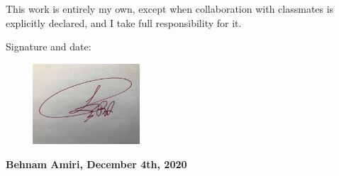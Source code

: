 \documentclass[fleqn]{article}
\begin{document}
\bigbreak

\Large This work is entirely my own, except when collaboration with classmates is explicitly declared, and I take full responsibility for it.

\bigbreak

\Large Signature and date:

\bigbreak

\bigbreak


\includegraphics[height=3cm, width=6cm]{signature.jpg}

\Large \textbf{ Behnam Amiri, December 4th, 2020 }


\pagebreak
\end{document}
